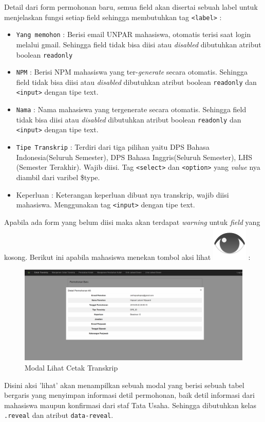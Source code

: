 \documentclass[a4paper,twoside]{article}
\begin{document}
\begin{enumerate}
		Detail dari form permohonan baru, semua field akan disertai sebuah label untuk menjelaskan fungsi setiap field sehingga membutuhkan tag \texttt{<label>}  :
		\begin{itemize}	
			\item \texttt{Yang memohon} : Berisi email UNPAR mahasiswa, otomatis terisi saat login melalui gmail. Sehingga field tidak bisa diisi atau \textit{disabled} dibutuhkan atribut boolean \verb|readonly|
			\item \texttt{NPM} : Berisi NPM mahasiswa yang ter-\textit{generate} secara otomatis. Sehingga field tidak bisa diisi atau \textit{disabled} dibutuhkan atribut boolean \verb|readonly| dan \texttt{<input>} dengan tipe text.
			\item \texttt{Nama} : Nama mahasiswa yang tergenerate secara otomatis. Sehingga field tidak bisa diisi atau \textit{disabled} dibutuhkan atribut boolean \verb|readonly| dan \texttt{<input>} dengan tipe text.
			\item \texttt{Tipe Transkrip} : Terdiri dari tiga pilihan yaitu DPS Bahasa Indonesia(Seluruh Semester), DPS Bahasa Inggris(Seluruh Semester), LHS (Semester Terakhir). Wajib diisi. Tag \texttt{<select>} dan \texttt{<option>} yang \textit{value} nya diambil dari varibel \$type.
			\item Keperluan : Keterangan keperluan dibuat nya transkrip, wajib diisi mahasiswa. Menggunakan tag \texttt{<input>} dengan tipe text.
		\end{itemize}
		Apabila ada form yang belum diisi maka akan terdapat \textit{warning} untuk \textit{field} yang kosong.
		Berikut ini apabila mahasiswa menekan tombol aksi lihat \includegraphics[height=0.7\baselineskip]{tombol_eye.png} :
		\begin{figure} [H]
			\centering  
			\includegraphics[scale=0.5]{Modal-Lihat-Cetak-Transkrip.png}  
			\caption{Modal Lihat Cetak Transkrip} 
		\end{figure}
		\noindent Disini aksi 'lihat' akan menampilkan sebuah modal yang berisi sebuah tabel bergaris yang menyimpan informasi detil permohonan, baik detil informasi dari mahasiswa maupun konfirmasi dari staf Tata Usaha. Sehingga dibutuhkan kelas \verb|.reveal| dan atribut \verb|data-reveal|.
		

\end{enumerate}
\end{document}
